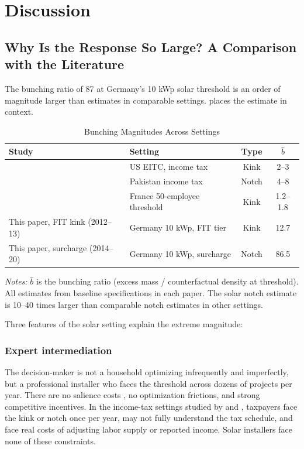 \documentclass[12pt]{article}
\begin{document}
\section{Discussion}
\label{sec:discussion}

\subsection{Why Is the Response So Large? A Comparison with the Literature}

The bunching ratio of 87 at Germany's 10 kWp solar threshold is an order of magnitude larger than estimates in comparable settings.  places the estimate in context.

\begin{table}[t]
\centering
\caption{Bunching Magnitudes Across Settings}
\label{tab:benchmarks}
\begin{tabular}{llcc}
\toprule
Study & Setting & Type & $\hat{b}$ \\
\midrule
\citet{saez2010taxpayers} & US EITC, income tax & Kink & 2--3 \\
\citet{kleven2013using} & Pakistan income tax & Notch & 4--8 \\
\citet{garicano2016firm} & France 50-employee threshold & Kink & 1.2--1.8 \\
This paper, FIT kink (2012--13) & Germany 10 kWp, FIT tier & Kink & 12.7 \\
This paper, surcharge (2014--20) & Germany 10 kWp, surcharge & Notch & 86.5 \\
\bottomrule
\end{tabular}

\vspace{0.5em}
\begin{flushleft}\small \textit{Notes:} $\hat{b}$ is the bunching ratio (excess mass / counterfactual density at threshold). All estimates from baseline specifications in each paper. The solar notch estimate is 10--40 times larger than comparable notch estimates in other settings.\end{flushleft}
\end{table}

Three features of the solar setting explain the extreme magnitude:

\subsubsection*{Expert intermediation} The decision-maker is not a household optimizing infrequently and imperfectly, but a professional installer who faces the threshold across dozens of projects per year. There are no salience costs \citep{chetty2009salience}, no optimization frictions, and strong competitive incentives. In the income-tax settings studied by \citet{saez2010taxpayers} and \citet{kleven2013using}, taxpayers face the kink or notch once per year, may not fully understand the tax schedule, and face real costs of adjusting labor supply or reported income. Solar installers face none of these constraints.
\end{document}
